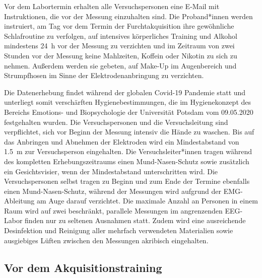 						Vor dem Labortermin erhalten alle Versuchspersonen eine E-Mail mit Instruktionen, die vor der Messung einzuhalten sind. Die Proband*innen werden instruiert, am Tag vor dem Termin der Furchtakquisition ihre gewöhnliche Schlafroutine zu verfolgen, auf intensives körperliches Training und Alkohol mindestens \SI{24}{\hour} vor der Messung zu verzichten und im Zeitraum von zwei Stunden vor der Messung keine Mahlzeiten, Koffein oder Nikotin zu sich zu nehmen. Außerdem werden sie gebeten, auf Make-Up im Augenbereich und Strumpfhosen im Sinne der Elektrodenanbringung zu verzichten. 
						
						Die Datenerhebung findet während der globalen Covid-19 Pandemie statt und unterliegt somit verschärften Hygienebestimmungen, die im Hygienekonzept des Bereichs Emotions- und Biopsychologie der Universität Potsdam vom 09.05.2020 festgehalten wurden.
						Die Versuchspersonen und die Versuchsleitung sind verpflichtet, sich vor Beginn der Messung intensiv die Hände zu waschen. Bis auf das Anbringen und Abnehmen der Elektroden wird ein Mindestabstand von \SI{1.5}{\meter} zur Versuchsperson eingehalten. Die Versuchsleiter*innen tragen während des kompletten Erhebungszeitraums einen Mund-Nasen-Schutz sowie zusätzlich ein Gesichtsvisier, wenn der Mindestabstand unterschritten wird. Die Versuchspersonen selbst tragen zu Beginn und zum Ende der Termine ebenfalls einen Mund-Nasen-Schutz, während der Messungen wird aufgrund der EMG-Ableitung am Auge darauf verzichtet. Die maximale Anzahl an Personen in einem Raum wird auf zwei beschränkt, parallele Messungen im angrenzenden EEG-Labor finden nur zu seltenen Ausnahmen statt. Zudem wird eine ausreichende Desinfektion und Reinigung aller mehrfach verwendeten Materialien sowie ausgiebiges Lüften zwischen den Messungen akribisch eingehalten. 
		
						
			\subsection{Vor dem Akquisitionstraining}\label{preacq}

